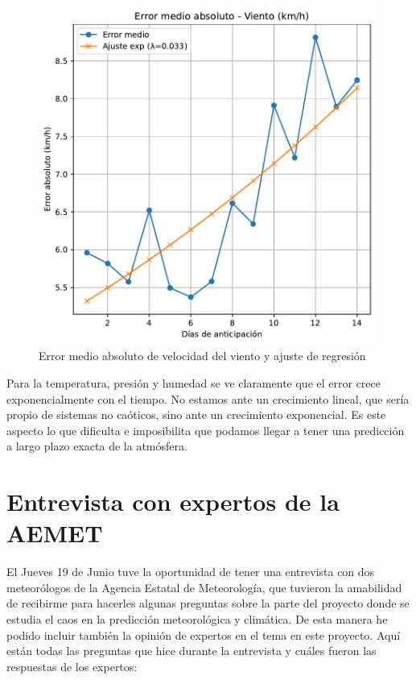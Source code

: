 \documentclass[
  10pt,
  a4paper,
  DIV=11,
  numbers=noendperiod,
  open=any]{scrreprt}
\numberwithin{equation}{chapter}
\numberwithin{equation}{section}
\renewcommand{\[}{\begin{equation}}
\renewcommand{\]}{\end{equation}}
\begin{document}
\begin{figure}[h]
  \centering
  \includegraphics[width=0.99\textwidth]{03-meteorologia/predicciones_files/figure-pdf/cell-4-output-4.pdf}
  \caption{Error medio absoluto de velocidad del viento y ajuste de regresión}
\end{figure}

Para la temperatura, presión y humedad se ve claramente que el error crece exponencialmente con el tiempo. No estamos ante un crecimiento lineal, que sería propio de sistemas no caóticos, sino ante un crecimiento exponencial. Es este aspecto lo que dificulta e imposibilita que podamos llegar a tener una predicción a largo plazo exacta de la atmósfera. 


\chapter{Entrevista con expertos de la
AEMET}\label{entrevista-con-expertos-de-la-aemet}

El Jueves 19 de Junio tuve la oportunidad de tener una entrevista con
dos meteorólogos de la Agencia Estatal de Meteorología, que tuvieron la amabilidad de recibirme para hacerles
algunas preguntas sobre la parte del proyecto donde se estudia el caos
en la predicción meteorológica y climática. De esta manera he podido
incluir también la opinión de expertos en el tema en este proyecto. Aquí
están todas las preguntas que hice durante la entrevista y cuáles fueron
las respuestas de los expertos:
\end{document}
